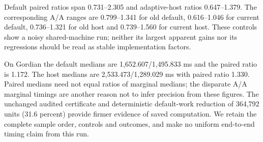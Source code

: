 

Default paired ratios span 0.731--2.305 and adaptive-host ratios
0.647--1.379. The corresponding A/A ranges are 0.799--1.341 for old default,
0.616--1.046 for current default, 0.736--1.321 for old host and
0.739--1.560 for current host. These controls show a noisy shared-machine
run; neither its largest apparent gains nor its regressions should be read
as stable implementation factors.

On Gordian the default medians are 1,652.607/1,495.833 ms and the paired ratio
is 1.172. The host medians are 2,533.473/1,289.029 ms with paired ratio 1.330.
Paired medians need not equal ratios of marginal medians; the disparate A/A
marginal timings are another reason not to infer precision from these figures.
The unchanged audited certificate and deterministic default-work reduction
of 364,792 units (31.6 percent) provide firmer evidence of saved computation.
We retain the complete sample order, controls and outcomes, and make no uniform
end-to-end timing claim from this run.
